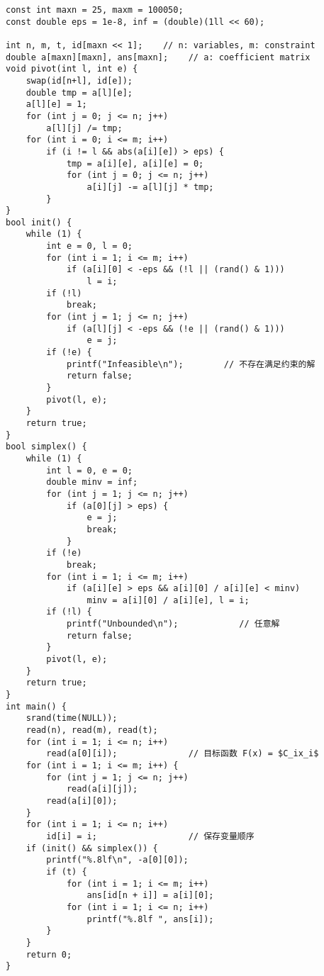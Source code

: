 \begin{verbatim}
const int maxn = 25, maxm = 100050;
const double eps = 1e-8, inf = (double)(1ll << 60);

int n, m, t, id[maxn << 1];    // n: variables, m: constraint
double a[maxn][maxn], ans[maxn];    // a: coefficient matrix
void pivot(int l, int e) {
    swap(id[n+l], id[e]);
    double tmp = a[l][e];
    a[l][e] = 1;
    for (int j = 0; j <= n; j++)
        a[l][j] /= tmp;
    for (int i = 0; i <= m; i++)
        if (i != l && abs(a[i][e]) > eps) {
            tmp = a[i][e], a[i][e] = 0;
            for (int j = 0; j <= n; j++)
                a[i][j] -= a[l][j] * tmp;
        }
}
bool init() {
    while (1) {
        int e = 0, l = 0;
        for (int i = 1; i <= m; i++)
            if (a[i][0] < -eps && (!l || (rand() & 1)))
                l = i;
        if (!l)
            break;
        for (int j = 1; j <= n; j++)
            if (a[l][j] < -eps && (!e || (rand() & 1)))
                e = j;
        if (!e) {
            printf("Infeasible\n");        // 不存在满足约束的解
            return false;
        }
        pivot(l, e);
    }
    return true;
}
bool simplex() {
    while (1) {
        int l = 0, e = 0;
        double minv = inf;
        for (int j = 1; j <= n; j++)
            if (a[0][j] > eps) {
                e = j;
                break;
            }
        if (!e)
            break;
        for (int i = 1; i <= m; i++)
            if (a[i][e] > eps && a[i][0] / a[i][e] < minv)
                minv = a[i][0] / a[i][e], l = i;
        if (!l) {
            printf("Unbounded\n");            // 任意解
            return false;
        }
        pivot(l, e);
    }
    return true;
}
int main() {
    srand(time(NULL));
    read(n), read(m), read(t);
    for (int i = 1; i <= n; i++)
        read(a[0][i]);              // 目标函数 F(x) = $C_ix_i$
    for (int i = 1; i <= m; i++) {
        for (int j = 1; j <= n; j++)
            read(a[i][j]);
        read(a[i][0]);
    }
    for (int i = 1; i <= n; i++)
        id[i] = i;                  // 保存变量顺序
    if (init() && simplex()) {
        printf("%.8lf\n", -a[0][0]);
        if (t) {
            for (int i = 1; i <= m; i++)
                ans[id[n + i]] = a[i][0];
            for (int i = 1; i <= n; i++)
                printf("%.8lf ", ans[i]);
        }
    }
    return 0;
}
\end{verbatim}